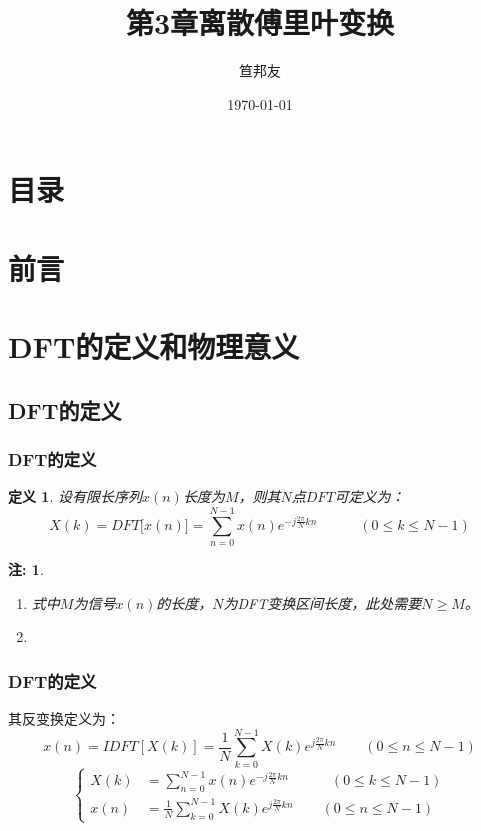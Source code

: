 \documentclass[notheorems,compress,mathserif,table]{beamer}
\title{\heiti 第3章\quad 离散傅里叶变换}
\author[\textcolor{blue}]{{\sihao\kaishu  笪邦友}}
\institute{\sihao\lishu  \textcolor{violet}{中南民族大学~~ 电子信息工程学院}}
\date{\fangsong\today}
\newtheorem{definition}{定义}
\newtheorem{zhu}{注:}
\begin{document}
	\kaishu
	\frame{ \titlepage }
	\section*{目录}
	\section*{前言}


\section{DFT的定义和物理意义}

\subsection{DFT的定义}
%
%
\begin{frame}[shrink]\frametitle{DFT的定义}%
\begin{definition}
设有限长序列$x(n)$长度为$M$，则其$N$点$DFT$可定义为：
$$X(k) = DFT\big[x(n)\big] =  \sum_{n=0}^{N-1}x(n)e^{-j\frac{2\pi}{N}kn}  \quad\quad\quad (0 \leq k \leq N-1)$$
\end{definition}
\begin{zhu}
\begin{enumerate}
	\item [(1)]   式中$ M $为信号$ x(n) $的长度，$ N $为DFT变换区间长度，此处需要$ N\geq M $。
	\item [(2)]
\end{enumerate}
\end{zhu}

\end{frame}




\begin{frame}[shrink]\frametitle{DFT的定义}%
    其反变换定义为：
    $$x(n) = IDFT[X(k)] =   \frac{1}{N}\sum_{k=0}^{N-1}X(k)e^{j\frac{2\pi}{N}kn} \quad\quad (0 \leq n \leq N-1)$$
    \begin{equation*}
           \left\{ \begin{aligned}
               X(k) &=  \sum_{n=0}^{N-1}x(n)e^{-j\frac{2\pi}{N}kn}  \quad\quad\quad (0 \leq k \leq N-1) \\
               x(n) &=   \frac{1}{N}\sum_{k=0}^{N-1}X(k)e^{j\frac{2\pi}{N}kn} \quad\quad (0 \leq n \leq N-1)
           \end{aligned} \right.
    \end{equation*}
\end{frame}
\end{document}
